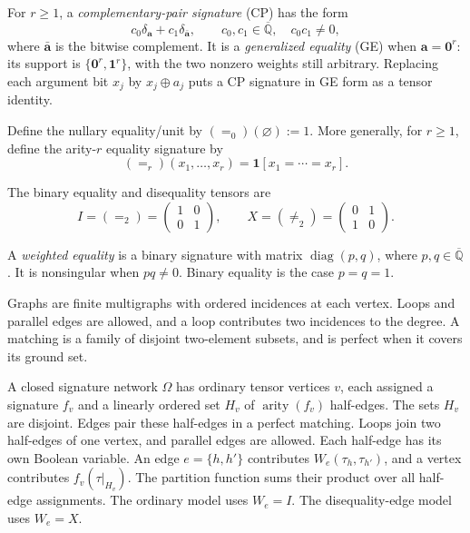 \documentclass[11pt,letterpaper,onecolumn]{article}
\theoremstyle{plain}
\theoremstyle{definition}
\theoremstyle{remark}
\newcommand{\AlgNums}{\overline{\mathbb Q}}
\newcommand{\diag}{\operatorname{diag}}
\newcommand{\arity}{\operatorname{arity}}
\newcommand{\Eq}{=}
\newcommand{\Neq}{\neq}
\newcommand{\one}{\mathbf 1}
\newcommand{\zero}{\mathbf 0}
\begin{document}
For \(r\ge1\), a \emph{complementary-pair signature} (CP) has the form
\begin{equation*}
  c_0\delta_{\mathbf{a}}+c_1\delta_{\bar {\mathbf{a}}},
  \qquad c_0,c_1\in\AlgNums,\quad c_0c_1\ne0,
\end{equation*}
where \(\bar {\mathbf{a}}\) is the bitwise complement.  It is a
\emph{generalized equality} (GE) when \({\mathbf{a}}=\zero^r\): its support is
\(\{\zero^r,\one^r\}\), with the two nonzero weights still arbitrary.
Replacing each argument bit \(x_j\) by \(x_j\oplus a_j\)
puts a CP signature in GE form as a tensor identity.

Define the nullary equality/unit by \((\Eq_0)(\varnothing):=1\).  More generally,
for \(r\ge1\), define the arity-\(r\) equality signature by
\[
  (\Eq_r)(x_1,\ldots,x_r)=\one[x_1=\cdots=x_r].
\]

The binary equality and disequality tensors are
\[
  I=(\Eq_2)=
  \begin{pmatrix}1&0\\0&1\end{pmatrix},
  \qquad
  X=(\Neq_2)=
  \begin{pmatrix}0&1\\1&0\end{pmatrix}.
\]

A \emph{weighted equality} is a binary signature with matrix \(\diag(p,q)\),
where \(p,q\in\AlgNums\). It is nonsingular when \(pq\ne0\).
Binary equality is the case \(p=q=1\).

Graphs are finite multigraphs with ordered incidences at each vertex.
Loops and parallel edges are allowed, and a loop contributes two incidences
to the degree. A matching is a family of disjoint two-element subsets,
and is perfect when it covers its ground set.

A closed signature network \(\Omega\) has ordinary tensor vertices
\(v\), each assigned a signature \(f_v\) and a linearly ordered set
\(H_v\) of \(\arity(f_v)\) half-edges.  The sets \(H_v\) are
disjoint.  Edges pair these half-edges in a perfect matching.  Loops join
two half-edges of one vertex, and parallel edges are allowed.  Each half-edge
has its own Boolean variable.  An edge \(e=\{h,h'\}\) contributes
\(W_e(\tau_h,\tau_{h'})\), and a vertex contributes \(f_v(\tau|_{H_v})\).
The partition function sums their product over all half-edge assignments.
The ordinary model uses \(W_e=I\). The disequality-edge model uses \(W_e=X\).
\end{document}
